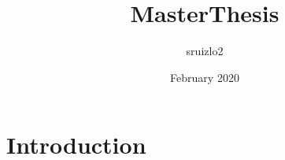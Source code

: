 \documentclass{article}
\title{MasterThesis}
\author{sruizlo2 }
\date{February 2020}
\begin{document}
\maketitle

\section{Introduction}
\end{document}
